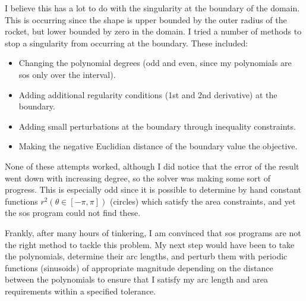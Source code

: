 I believe this has a lot to do with the singularity at the boundary of the domain. This is occurring since the shape is
upper bounded by the outer radius of the rocket, but lower bounded by zero in the domain. I tried a
number of methods to stop a singularity from occurring at the boundary. These included:
\begin{itemize}
    \item Changing the polynomial degrees (odd and even, since my polynomials are
    \gls{sos} only over the interval).
    \item Adding additional regularity conditions (1st and 2nd derivative) at the boundary.
    \item Adding small perturbations at the boundary through inequality constraints.
    \item Making the negative Euclidian distance of the boundary value the objective.
\end{itemize}

None of these attempts worked, although I did notice that the error of the result went down with
increasing degree, so the solver was making some sort of progress.
This is especially odd since it is possible to determine by hand constant
functions $r^2(\theta \in [-\pi, \pi])$ (circles) which satisfy the area constraints,
and yet the \gls{sos} program could not find these.

Frankly, after many hours of tinkering, I am convinced that \gls{sos} programs are not the
right method to tackle this problem. My next step would have been to take
the polynomials, determine their arc lengths, and perturb them with periodic functions (sinusoids)
of appropriate magnitude depending on the distance between the polynomials to ensure that I satisfy
my arc length and area requirements within a specified tolerance.

